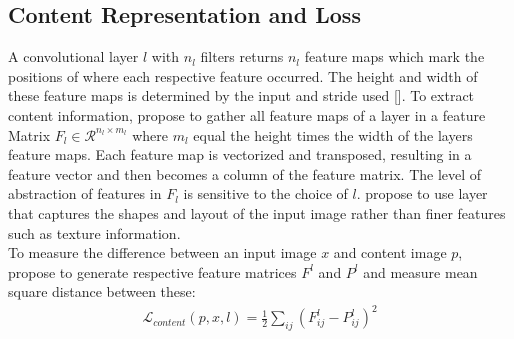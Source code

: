 \documentclass{seminar}
\begin{document}
\subsection{Content Representation and Loss}
A convolutional layer $l$ with $n_l$ filters returns $n_l$ feature maps which mark the positions of where each respective feature occurred. The height and width of these feature maps is determined by the input and stride used [\cite{lecun1999object}]. To extract content information, \cite{gatys2015neural} propose to gather all feature maps of a layer in a feature Matrix $F_l\in\mathcal{R}^{n_l \times m_l}$ where $m_l$ equal the height times the width of the layers feature maps. Each feature map is vectorized and transposed, resulting in a feature vector and then becomes a column of the feature matrix. The level of abstraction of features in $F_l$ is sensitive to the choice of $l$. \cite{gatys2015neural} propose to use layer that captures the shapes and layout of the input image rather than finer features such as texture information.\\
To measure the difference between an input image $x$ and content image $p$, \cite{gatys2015neural} propose to generate respective feature matrices $F^l$ and $P^l$ and measure mean square distance between these:\\
\begin{align}
	\mathcal{L}_{content}(p, x, l) = \frac{1}{2}\sum_{ij}(F^l_{ij} - P^l_{ij})^2
\end{align}
\end{document}

